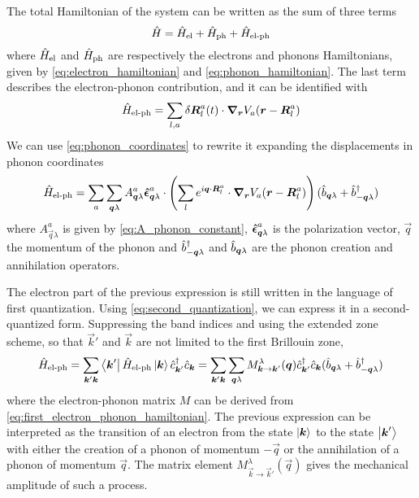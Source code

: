 The total Hamiltonian of the system can be written as the sum of three terms
\begin{equation}
    \hat{H} = \hat{H}_\text{el} + \hat{H}_\text{ph} + \hat{H}_\text{el-ph}
\end{equation}
where $\hat{H}_\text{el}$ and $\hat{H}_\text{ph}$ are respectively the electrons and phonons Hamiltonians, given by \cref{eq:electron_hamiltonian} and \cref{eq:phonon_hamiltonian}. The last term describes the  electron-phonon contribution, and it can be identified with
\begin{equation}
    \hat{H}_\text{el-ph} = \sum_{l,a} \delta \mathbf{\boldsymbol{R}}_l^a(t) \cdot \grad_{\mathbf{\boldsymbol{r}}} V_a(\mathbf{\boldsymbol{r}} - \mathbf{\boldsymbol{R}}_l^a)
\end{equation}
We can use \cref{eq:phonon_coordinates} to rewrite it expanding the displacements in phonon coordinates
\begin{equation} \label{eq:first_electron_phonon_hamiltonian}
    \hat{H}_\text{el-ph} = \sum_{a} \sum_{\mathbf{\boldsymbol{q}}\lambda} A_{\mathbf{\boldsymbol{q}}\lambda}^a \mathbf{\boldsymbol{\hat{\epsilon}}}_{\mathbf{\boldsymbol{q}}\lambda}^a \cdot \left( \sum_l e^{i\mathbf{\boldsymbol{q}} \cdot \mathbf{\boldsymbol{R}}_l^a}   \cdot \grad_{\mathbf{\boldsymbol{r}}} V_a(\mathbf{\boldsymbol{r}} - \mathbf{\boldsymbol{R}}_l^a) \right) (\hat{b}_{\mathbf{\boldsymbol{q}}\lambda} + \hat{b}^\dagger_{-\mathbf{\boldsymbol{q}}\lambda})
\end{equation}
where $A_{\vec{q}\lambda}^a$ is given by \cref{eq:A_phonon_constant}, $\mathbf{\boldsymbol{\hat{\epsilon}}}_{\mathbf{\boldsymbol{q}}\lambda}^a$ is the polarization vector, $\vec{q}$ the momentum of the phonon and $\hat{b}^\dagger_{-\mathbf{\boldsymbol{q}}\lambda}$ and $\hat{b}_{\mathbf{\boldsymbol{q}}\lambda}$ are the phonon creation and annihilation operators.

The electron part of the previous expression is still written in the language of first quantization. Using \cref{eq:second_quantization}, we can express it in a second-quantized form. Suppressing the band indices and using the extended zone scheme, so that $\vec{k}'$ and $\vec{k}$ are not limited to the first Brillouin zone,
\begin{equation} \label{eq:general_electron_phonon_hamiltonian}
    \hat{H}_\text{el-ph} = \sum_{\mathbf{\boldsymbol{k}}'\mathbf{\boldsymbol{k}}} \bra{\mathbf{\boldsymbol{k}}'} \hat{H}_\text{el-ph} \ket{\mathbf{\boldsymbol{k}}} \hat{c}^\dagger_{\mathbf{\boldsymbol{k}}'}\hat{c}_{\mathbf{\boldsymbol{k}}}
    = \sum_{\mathbf{\boldsymbol{k}}'\mathbf{\boldsymbol{k}}} \sum_{\mathbf{\boldsymbol{q}}\lambda} M_{\mathbf{\boldsymbol{k}} \rightarrow \mathbf{\boldsymbol{k}}'}^\lambda(\mathbf{\boldsymbol{q}}) \hat{c}^\dagger_{\mathbf{\boldsymbol{k}}'}\hat{c}_{\mathbf{\boldsymbol{k}}} (\hat{b}_{\mathbf{\boldsymbol{q}}\lambda} + \hat{b}^\dagger_{-\mathbf{\boldsymbol{q}}\lambda})
\end{equation}
where the electron-phonon matrix $M$ can be derived from \cref{eq:first_electron_phonon_hamiltonian}. The previous expression can be interpreted as the transition of an electron from the state $\ket{\mathbf{\boldsymbol{k}}}$ to the state $\ket{\mathbf{\boldsymbol{k}}'}$ with either the creation of a phonon of momentum $-\vec{q}$ or the annihilation of a phonon of momentum $\vec{q}$. The matrix element $M_{\vec{k} \rightarrow \vec{k}'}^\lambda(\vec{q})$ gives the mechanical amplitude of such a process.

